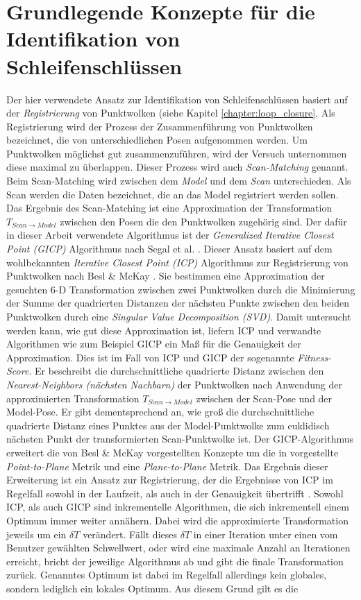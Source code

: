 \section{Grundlegende Konzepte für die Identifikation von Schleifenschlüssen}

Der hier verwendete Ansatz zur Identifikation von Schleifenschlüssen basiert auf der \emph{Registrierung} von Punktwolken (siehe Kapitel \ref{chapter:loop_closure}.  Als Registrierung wird der Prozess der Zusammenführung von Punktwolken bezeichnet, die von unterschiedlichen Posen aufgenommen werden. Um Punktwolken möglichst gut zusammenzuführen, wird der Versuch unternommen diese maximal zu überlappen. Dieser Prozess wird auch \emph{Scan-Matching} genannt. Beim Scan-Matching wird zwischen dem \emph{Model} und dem \emph{Scan} unterschieden. Als Scan werden die Daten bezeichnet, die an das Model registriert werden sollen. Das Ergebnis des Scan-Matching ist eine Approximation der Transformation $T_{Scan \rightarrow Model}$ zwischen den Posen die den Punktwolken zugehörig sind. Der dafür in dieser Arbeit verwendete Algorithmus ist der \emph{Generalized Iterative Closest Point (GICP)} Algorithmus nach Segal et al. \cite{segal2009generalized}. Dieser Ansatz basiert auf dem wohlbekannten \emph{Iterative Closest Point (ICP)} Algorithmus zur Registrierung von Punktwolken nach Besl \& McKay \cite{besl1992method}. Sie bestimmen eine Approximation der gesuchten 6-D Transformation zwischen zwei Punktwolken durch die Minimierung der Summe der quadrierten Distanzen der nächsten Punkte zwischen den beiden Punktwolken durch eine \emph{Singular Value Decomposition (SVD)}. Damit untersucht werden kann, wie gut diese Approximation ist, liefern ICP und verwandte Algorithmen wie zum Beispiel GICP ein Maß für die Genauigkeit der Approximation. Dies ist im Fall von ICP und GICP der sogenannte \emph{Fitness-Score}. Er beschreibt die durchschnittliche quadrierte Distanz zwischen den \emph{Nearest-Neighbors (nächsten Nachbarn)} der Punktwolken nach Anwendung der approximierten Transformation $T_{Scan \rightarrow Model}$ zwischen der Scan-Pose und der Model-Pose. Er gibt dementsprechend an, wie groß die durchschnittliche quadrierte Distanz eines Punktes aus der Model-Punktwolke zum euklidisch nächsten Punkt der transformierten Scan-Punktwolke ist. Der GICP-Algorithmus erweitert die von Besl \& McKay \cite{besl1992method} vorgestellten Konzepte um die in \cite{chen1992object} vorgestellte \emph{Point-to-Plane} Metrik und eine \emph{Plane-to-Plane} Metrik. Das Ergebnis dieser Erweiterung ist ein Ansatz zur Registrierung, der die Ergebnisse von ICP im Regelfall sowohl in der Laufzeit, als auch in der Genauigkeit übertrifft \cite{segal2009generalized}. Sowohl ICP, als auch GICP sind inkrementelle Algorithmen, die sich inkrementell einem Optimum immer weiter annähern. Dabei wird die approximierte Transformation jeweils um ein $\delta T$ verändert. Fällt dieses $\delta T$ in einer Iteration unter einen vom Benutzer gewählten Schwellwert, oder wird eine maximale Anzahl an Iterationen erreicht, bricht der jeweilige Algorithmus ab und gibt die finale Transformation zurück. Genanntes Optimum ist dabei im Regelfall allerdings kein globales, sondern lediglich ein lokales Optimum. Aus diesem Grund gilt es die 